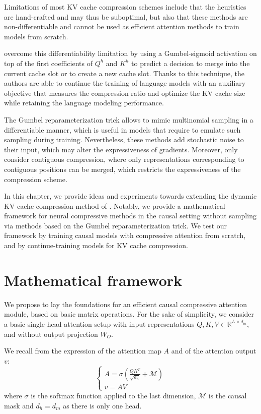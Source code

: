 Limitations of most KV cache compression schemes include that the heuristics are hand-crafted and may thus be suboptimal, but also that these methods are non-differentiable and cannot be used as efficient attention methods to train models from scratch.

\citet{nawrot2024dynamic} overcome this differentiability limitation by using a Gumbel-sigmoid activation on top of the first coefficients of $Q^h$ and $K^h$ to predict a decision to merge into the current cache slot or to create a new cache slot. Thanks to this technique, the authors are able to continue the training of language models with an auxiliary objective that measures the compression ratio and optimize the KV cache size while retaining the language modeling performance.

The Gumbel reparameterization trick \citep{jang2017categorical} allows to mimic multinomial sampling in a differentiable manner, which is useful in models that require to emulate such sampling during training. Nevertheless, these methods add stochastic noise to their input, which may alter the expressiveness of gradients. Moreover, \citet{nawrot2024dynamic} only consider contiguous compression, where only representations corresponding to contiguous positions can be merged, which restricts the expressiveness of the compression scheme.

In this chapter, we provide ideas and experiments towards extending the dynamic KV cache compression method of \citet{nawrot2024dynamic}. Notably, we provide a mathematical framework for neural compressive methods in the causal setting without sampling via methods based on the Gumbel reparameterization trick. We test our framework by training causal models with compressive attention from scratch, and by continue-training models for KV cache compression.


\section{Mathematical framework}

We propose to lay the foundations for an efficient causal compressive attention module, based on basic matrix operations. For the sake of simplicity, we consider a basic single-head attention setup with input representations $Q, K, V \in \mathbb{R}^{L \times d_m}$, and without output projection $W_O$.

We recall from  the expression of the attention map $A$ and of the attention output $v$:
\begin{equation}
\begin{cases}
A = \sigma \left(\frac{Q K^T}{\sqrt{d_h}} + \mathcal{M} \right) \\
v = AV
\end{cases}
\label{eq:attn_sing_head}
\end{equation}
where $\sigma$ is the softmax function applied to the last dimension, $\mathcal{M}$ is the causal mask and $d_h=d_m$ as there is only one head.

